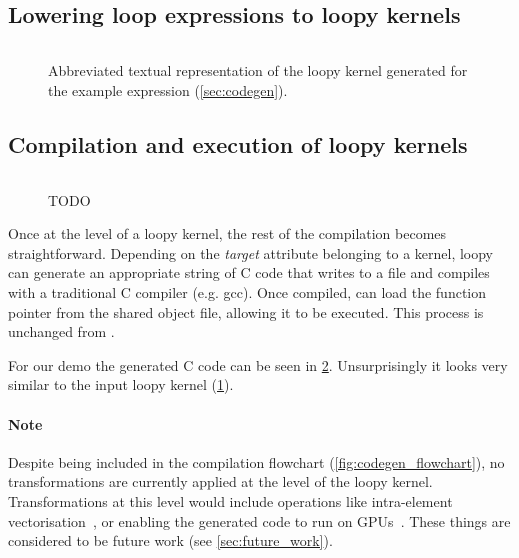 \documentclass[thesis]{subfiles}
\begin{document}

\subsection{Lowering loop expressions to loopy kernels}

\begin{figure}
  \centering
  \begin{minipage}{.8\textwidth}
    \inputminted{text}{./scripts/artefacts/codegen_example_loopy_kernel_tidy.txt}
  \end{minipage}
  \caption{
    Abbreviated textual representation of the loopy kernel generated for the example expression (\cref{sec:codegen}).
  }
  \label{lst:codegen_example_loopy_kernel}
\end{figure}



\subsection{Compilation and execution of loopy kernels}
\label{sec:codegen_loopy_kernel}

\begin{figure}
  \centering
  \begin{minipage}{.8\textwidth}
    \inputminted{c}{./scripts/artefacts/codegen_example_c_code_tidy.c}
  \end{minipage}
  \caption{
    TODO
  }
  \label{lst:codegen_example_c_code}
\end{figure}

Once at the level of a loopy kernel, the rest of the compilation becomes straightforward.
Depending on the \textit{target} attribute belonging to a kernel, loopy can generate an appropriate string of C code that  writes to a file and compiles with a traditional C compiler (e.g. gcc).
Once compiled,  can load the function pointer from the shared object file, allowing it to be executed.
This process is unchanged from .

For our demo the generated C code can be seen in \cref{lst:codegen_example_c_code}.
Unsurprisingly it looks very similar to the input loopy kernel (\cref{lst:codegen_example_loopy_kernel}).

\paragraph{Note}

Despite being included in the compilation flowchart (\cref{fig:codegen_flowchart}), no transformations are currently applied at the level of the loopy kernel.
Transformations at this level would include operations like intra-element vectorisation~\cite{sunStudyVectorizationMatrixfree2020}, or enabling the generated code to run on GPUs~\cite{fenics2021-kulkarni}.
These things are considered to be future work (see \cref{sec:future_work}).
\end{document}
